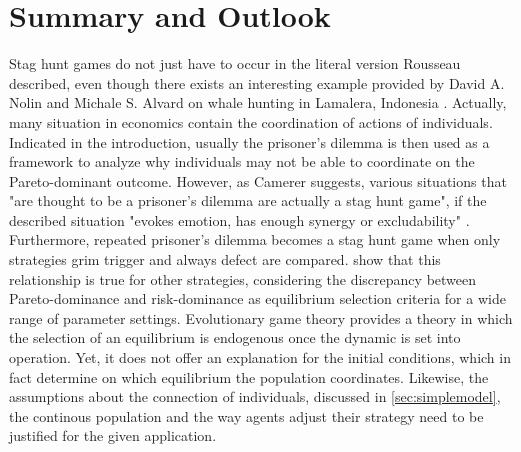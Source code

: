 \documentclass[11pt]{article}
\begin{document}
\section{Summary and Outlook}
Stag hunt games do not just have to occur in the literal version Rousseau
described, even though there exists an interesting example provided by 
David A. Nolin and Michale S. Alvard on whale hunting in Lamalera, Indonesia
\parencite{nolin_meat-sharing_2000}.
Actually, many situation in economics contain the coordination of actions
of individuals. 
Indicated in the introduction, usually the prisoner's dilemma is then used
as a framework to analyze why individuals may not be able to coordinate on the 
Pareto-dominant outcome. However, as Camerer
suggests, various situations that "are thought to be a prisoner's dilemma 
are actually a stag hunt game", if the described situation "evokes emotion,
has enough synergy or excludability" 
\parencite[376-377]{camerer_behavioral_2003}. Furthermore, repeated prisoner's
dilemma becomes a stag hunt game when only strategies grim trigger
and always defect are compared. \textcite{blonski_prisoners_2003} show that
this relationship is true for other strategies, considering the discrepancy
between Pareto-dominance and risk-dominance as equilibrium selection criteria 
for a wide range of parameter settings. 
Evolutionary game theory provides a theory in which the selection of an
equilibrium is endogenous once the dynamic is set into operation. Yet, it
does not offer an explanation for the initial conditions, which in fact 
determine on which equilibrium the population coordinates. Likewise, the
assumptions about the connection of individuals, discussed in 
\ref{sec:simplemodel}, the continous population and the way agents
adjust their strategy need to be justified for the given application. 
\end{document}
